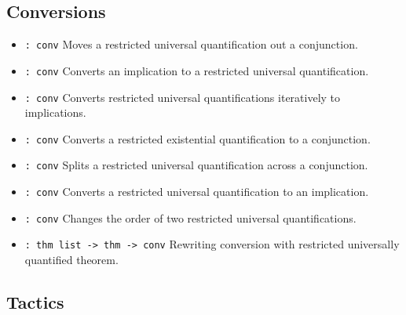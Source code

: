 \subsection*{Conversions}

\begin{itemize}
\item {} \verb|: conv|\newline
Moves a restricted universal quantification out a conjunction.

\item {} \verb|: conv|\newline
Converts an implication to a restricted universal quantification.

\item {} \verb|: conv|\newline
Converts restricted universal quantifications iteratively to implications.

\item {} \verb|: conv|\newline
Converts a restricted existential quantification to a conjunction.

\item {} \verb|: conv|\newline
Splits a restricted universal quantification across a conjunction.

\item {} \verb|: conv|\newline
Converts a restricted universal quantification to an implication.

\item {} \verb|: conv|\newline
Changes the order of two restricted universal quantifications.

\item {} \verb|: thm list -> thm -> conv|\newline
Rewriting conversion with restricted universally quantified theorem.
\end{itemize}

\subsection*{Tactics}

